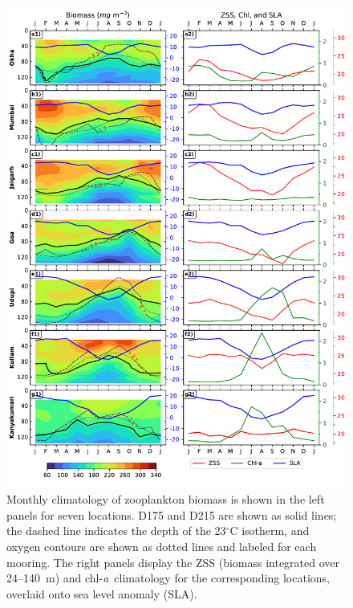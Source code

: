 \documentclass[authoryear,review,11pt]{elsarticle}
\newcommand{\chla}{chl-{\emph{a}}}
\begin{document}
\begin{figure}[htbp]
	\centering
	\includegraphics[width=\textwidth]{./figures/biomass_ss_chl_climatology.pdf} 
	\captionsetup{justification=justified,font=footnotesize,skip=0.05\baselineskip,width=\textwidth}
	\caption{Monthly climatology of zooplankton biomass is shown in the left panels for seven locations. D175 and D215 are shown as solid lines; the dashed line indicates the depth of the 23$^{\circ}$C isotherm, and oxygen contours are shown as dotted lines and labeled for each mooring. The right panels display the ZSS (biomass integrated over 24--140~m) and \chla\ climatology for the corresponding locations, overlaid onto sea level anomaly (SLA).}
	\label{fig:biomass_ss_chl_climatology}
\end{figure}
\end{document}

